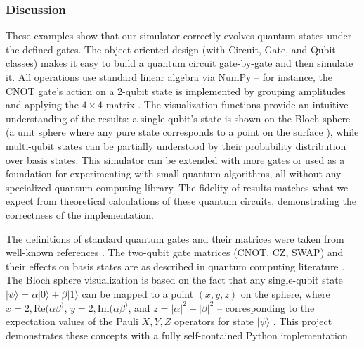 \documentclass{beamer}
\begin{document}
\begin{frame}
\frametitle{Discussion}

These examples show that our simulator correctly evolves quantum
states under the defined gates. The object-oriented design (with
Circuit, Gate, and Qubit classes) makes it easy to build a quantum
circuit gate-by-gate and then simulate it. All operations use standard
linear algebra via NumPy – for instance, the CNOT gate’s action on a
2-qubit state is implemented by grouping amplitudes and applying the
$4\times4$ matrix . The visualization functions provide an intuitive
understanding of the results: a single qubit’s state is shown on the
Bloch sphere (a unit sphere where any pure state corresponds to a
point on the surface ), while multi-qubit states can be partially
understood by their probability distribution over basis states. This
simulator can be extended with more gates or used as a foundation for
experimenting with small quantum algorithms, all without any
specialized quantum computing library. The fidelity of results matches
what we expect from theoretical calculations of these quantum
circuits, demonstrating the correctness of the implementation.

The definitions of standard quantum gates and their matrices were
taken from well-known references . The two-qubit gate matrices (CNOT,
CZ, SWAP) and their effects on basis states are as described in
quantum computing literature . The Bloch sphere visualization is based
on the fact that any single-qubit state
$|\psi\rangle=\alpha|0\rangle+\beta|1\rangle$ can be mapped to a point
$(x,y,z)$ on the sphere, where $x = 2,\mathrm{Re}(\alpha \beta^)$, $y
= 2,\mathrm{Im}(\alpha \beta^)$, and $z = |\alpha|^2 - |\beta|^2$ –
corresponding to the expectation values of the Pauli $X,Y,Z$ operators
for state $|\psi\rangle$ . This project demonstrates these concepts
with a fully self-contained Python implementation.
\end{frame}
\end{document}
